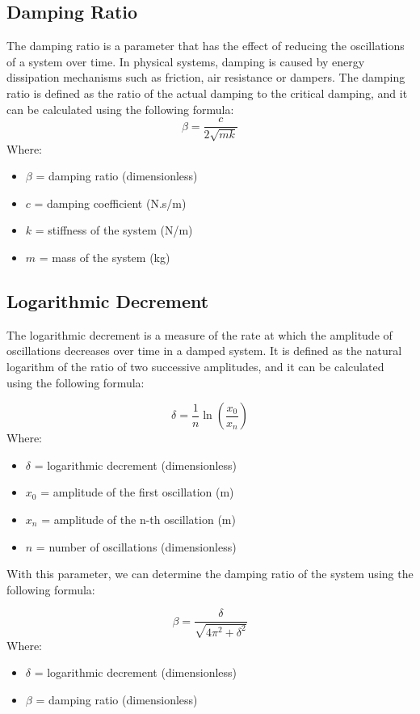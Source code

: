 \documentclass{article}  %
\begin{document}
\subsection{Damping Ratio}
The damping ratio is a parameter that has the effect of reducing the oscillations of a system over time. In physical systems, damping is caused by energy dissipation mechanisms such as friction, air resistance or dampers. The damping ratio is defined as the ratio of the actual damping to the critical damping, and it can be calculated using the following formula:
\begin{equation}
\beta = \frac{c}{2\sqrt{mk}}
\end{equation}
Where:
\begin{itemize}
  \item $\beta$ = damping ratio (dimensionless)
  \item $c$ = damping coefficient (N.s/m)
  \item $k$ = stiffness of the system (N/m)
  \item $m$ = mass of the system (kg)
\end{itemize}

\subsection{Logarithmic Decrement}
The logarithmic decrement is a measure of the rate at which the amplitude of oscillations decreases over time in a damped system. It is defined as the natural logarithm of the ratio of two successive amplitudes, and it can be calculated using the following formula:

\begin{equation}
\delta = \frac{1}{n} \ln \left( \frac{x_0}{x_n} \right)
\end{equation}
Where:
\begin{itemize}
  \item $\delta$ = logarithmic decrement (dimensionless)
  \item $x_0$ = amplitude of the first oscillation (m)
  \item $x_n$ = amplitude of the n-th oscillation (m)
  \item $n$ = number of oscillations (dimensionless)
\end{itemize}

With this parameter, we can determine the damping ratio of the system using the following formula:

\begin{equation}
\beta = \frac{\delta}{\sqrt{4\pi^2 + \delta^2}}
\label{eq:log_dec}
\end{equation}
Where:
\begin{itemize}
  \item $\delta$ = logarithmic decrement (dimensionless)
  \item $\beta$ = damping ratio (dimensionless)
\end{itemize}
\end{document}
